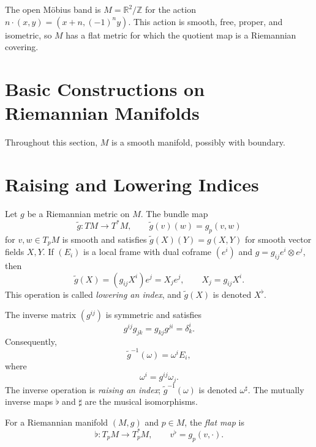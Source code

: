 \begin{example}
\label{ex:open-mobius-band}

The open Möbius band is $M=\mathbb R^2/\mathbb Z$ for the action
$n\cdot(x,y)=(x+n,(-1)^ny)$. This action is smooth, free, proper, and
isometric, so $M$ has a flat metric for which the quotient map is a Riemannian
covering.
\end{example}

\section{Basic Constructions on Riemannian Manifolds}

Throughout this section, $M$ is a smooth manifold, possibly with boundary.

\section{Raising and Lowering Indices}

Let $g$ be a Riemannian metric on $M$. The bundle map
\[
\widetilde g\colon TM\longrightarrow T^*M,
\qquad \widetilde g(v)(w)=g_p(v,w)
\]
for $v,w\in T_pM$ is smooth and satisfies $\widetilde g(X)(Y)=g(X,Y)$ for smooth
vector fields $X,Y$. If $(E_i)$ is a local frame with dual coframe $(e^i)$ and
$g=g_{ij}e^i\otimes e^j$, then
\[
\widetilde g(X)=(g_{ij}X^i)e^j=X_je^j,
\qquad X_j=g_{ij}X^i.
\]
This operation is called \emph{lowering an index}, and $\widetilde g(X)$ is denoted
$X^\flat$.

The inverse matrix $(g^{ij})$ is symmetric and satisfies
\[
g^{ij}g_{jk}=g_{kj}g^{ji}=\delta_k^i.
\]
Consequently,
\[
\widetilde g^{-1}(\omega)=\omega^iE_i,
\]
where
\begin{equation}
\omega^i=g^{ij}\omega_j. \tag{2.13}
\end{equation}
The inverse operation is \emph{raising an index}; $\widetilde g^{-1}(\omega)$ is denoted
$\omega^\sharp$. The mutually inverse maps $\flat$ and $\sharp$ are the musical
isomorphisms.

\begin{definition}
\label{def:flat-map}





For a Riemannian manifold $(M,g)$ and $p\in M$, the \emph{flat map} is
\[
\flat\colon T_pM\longrightarrow T_p^*M,
\qquad v^\flat=g_p(v,\cdot).
\]
\end{definition}

